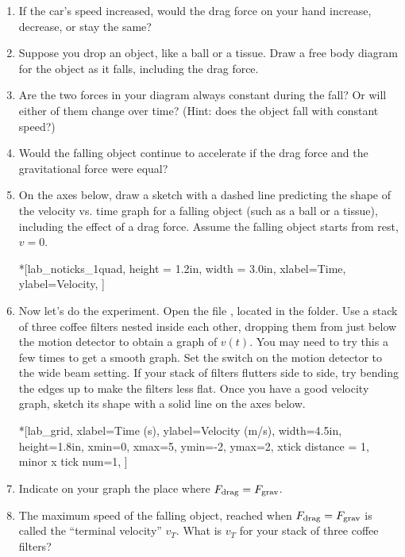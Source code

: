 \begin{enumerate}[labparts]
\item If the car's speed increased, would the drag force on your hand increase, decrease, or stay the same?
\answerspace{0.3in}

\item Suppose you drop an object, like a ball or a tissue.  Draw a free body diagram for the object as it falls, including the drag force.
\answerspace{1.2in}

\item Are the two forces in your diagram always constant during the fall?  Or will either of them change over time?  (Hint: does the object fall with constant speed?)
\answerspace{0.5in}

\item Would the falling object continue to accelerate if the drag force and the gravitational force were equal?
\answerspace{0.5in}

\item On the axes below, draw a sketch with a dashed line predicting the shape of the velocity vs. time graph for a falling object (such as a ball or a tissue), including the effect of a drag force.  Assume the falling object starts from rest, $v=0$.

\begin{lab_axis}*[lab_noticks_1quad,
	height = {1.2in}, width = {3.0in},
	xlabel={Time},
	ylabel={Velocity},
	]
\end{lab_axis}

\item Now let's do the experiment.  Open the file , located in the \filename{\coursefolder} folder. Use a stack of three coffee filters nested inside each other, dropping them from just below the motion detector to obtain a graph of $v(t)$.  You may need to try this a few times to get a smooth graph.  Set the switch on the motion detector to the wide beam setting.  If your stack of filters flutters side to side, try bending the edges up to make the filters less flat.  Once you have a good velocity graph, sketch its shape with a solid line on the axes below.  

\begin{lab_axis}*[lab_grid,
	xlabel={Time (s)},
	ylabel={Velocity (m/s)},
	width=4.5in, height=1.8in,
	xmin=0, xmax=5,
	ymin=-2, ymax=2,
	xtick distance = 1,
	minor x tick num=1,
	]
\end{lab_axis}

\item Indicate on your graph the place where $F_{\rm drag} = F_{\rm grav}$.  

\item The maximum speed of the falling object, reached when $F_{\rm drag} = F_{\rm grav}$ is called the ``terminal velocity'' $v_T$.  What is $v_T$ for your stack of three coffee filters?
\answerspace{0.5in}

\end{enumerate}

